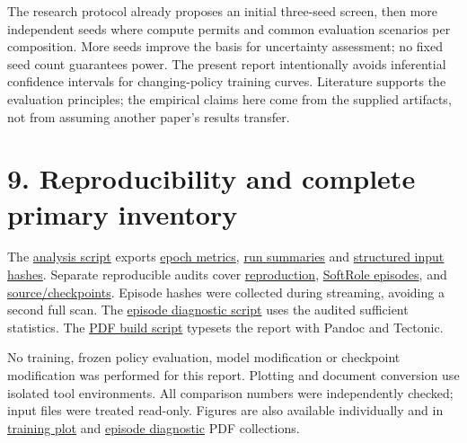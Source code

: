 \documentclass[
  10pt,
]{article}
\begin{document}
The research protocol already proposes an initial three-seed screen,
then more independent seeds where compute permits and common evaluation
scenarios per composition. More seeds improve the basis for uncertainty
assessment; no fixed seed count guarantees power. The present report
intentionally avoids inferential confidence intervals for
changing-policy training curves. Literature supports the evaluation
principles; the empirical claims here come from the supplied artifacts,
not from assuming another paper's results transfer.

\section{9. Reproducibility and complete primary
inventory}\label{reproducibility-and-complete-primary-inventory}

The \href{full_runs/analyze_full.py}{analysis script} exports
\href{full_runs/epoch_metrics.csv}{epoch metrics},
\href{full_runs/run_summary.csv}{run summaries} and
\href{full_runs/structured_input_hashes.json}{structured input hashes}.
Separate reproducible audits cover
\href{full_runs/reproduction_audit/audit.py}{reproduction},
\href{full_runs/softrole_audit/audit.py}{SoftRole episodes}, and
\href{full_runs/provenance_audit/audit.py}{source/checkpoints}. Episode
hashes were collected during streaming, avoiding a second full scan. The
\href{full_runs/plot_episode_diagnostics.py}{episode diagnostic script}
uses the audited sufficient statistics. The
\href{full_runs/build_pdf.py}{PDF build script} typesets the report with
Pandoc and Tectonic.

No training, frozen policy evaluation, model modification or checkpoint
modification was performed for this report. Plotting and document
conversion use isolated tool environments. All comparison numbers were
independently checked; input files were treated read-only. Figures are
also available individually and in
\href{full_runs/full_run_plots.pdf}{training plot} and
\href{full_runs/episode_diagnostic_plots.pdf}{episode diagnostic} PDF
collections.
\end{document}
